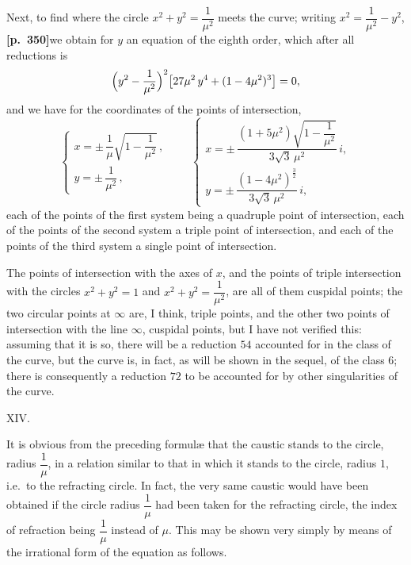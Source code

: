\documentclass[11pt]{article}
\begin{document}
Next, to find where the circle $x^{2} + y^{2} = \dfrac{1}{\mu^{2}}$ meets the curve; writing $x^{2} = \dfrac{1}{\mu^{2}} - y^{2}$, \textbf{[p.~350]}\quad we obtain for $y$ an equation of the eighth order, which after all reductions is
\[
\Bigl(y^{2} - \frac{1}{\mu^{2}}\Bigr)^{2}\bigl[27\mu^{2}\,y^{4} + (1 - 4\mu^{2})^{3}\bigr] = 0,
\]
and we have for the coordinates of the points of intersection,
\[
\left\{\begin{array}{l}
x = \pm\,\dfrac{1}{\mu}\sqrt{1 - \dfrac{1}{\mu^{2}}}\,,\\[8pt]
y = \pm\,\dfrac{1}{\mu^{2}}\,,
\end{array}\right.
\qquad
\left\{\begin{array}{l}
x = \pm\,\dfrac{(1 + 5\mu^{2})\sqrt{1 - \dfrac{1}{\mu^{2}}}}{3\sqrt{3}\,\mu^{2}}\,i,\\[8pt]
y = \pm\,\dfrac{(1 - 4\mu^{2})^{\tfrac{3}{2}}}{3\sqrt{3}\,\mu^{2}}\,i,
\end{array}\right.
\]
each of the points of the first system being a quadruple point of intersection, each of the points of the second system a triple point of intersection, and each of the points of the third system a single point of intersection.

The points of intersection with the axes of $x$, and the points of triple intersection with the circles $x^{2} + y^{2} = 1$ and $x^{2} + y^{2} = \dfrac{1}{\mu^{2}}$, are all of them cuspidal points; the two circular points at $\infty$ are, I think, triple points, and the other two points of intersection with the line $\infty$, cuspidal points, but I have not verified this: assuming that it is so, there will be a reduction $54$ accounted for in the class of the curve, but the curve is, in fact, as will be shown in the sequel, of the class $6$; there is consequently a reduction $72$ to be accounted for by other singularities of the curve.

\medskip
\begin{center}XIV.\end{center}

It is obvious from the preceding formul\ae{} that the caustic stands to the circle, radius $\dfrac{1}{\mu}$, in a relation similar to that in which it stands to the circle, radius $1$, i.e.\ to the refracting circle. In fact, the very same caustic would have been obtained if the circle radius $\dfrac{1}{\mu}$ had been taken for the refracting circle, the index of refraction being $\dfrac{1}{\mu}$ instead of $\mu$. This may be shown very simply by means of the irrational form of the equation as follows.
\end{document}
